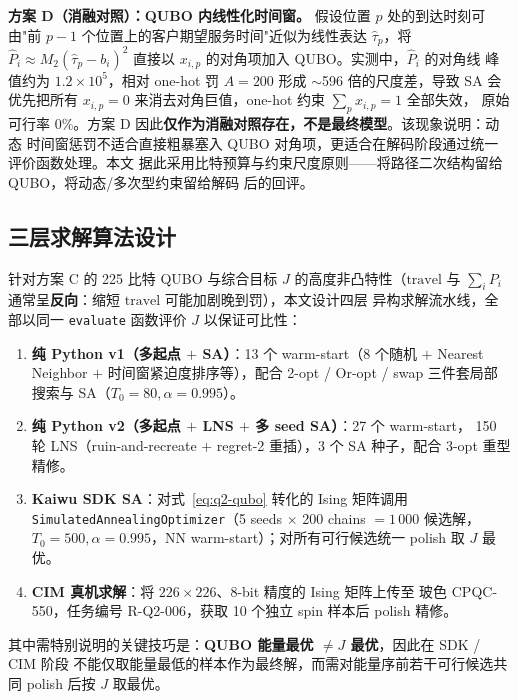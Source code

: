 \documentclass[UTF8,12pt,a4paper]{ctexart}
\begin{document}
\textbf{方案 D（消融对照）：QUBO 内线性化时间窗。} 假设位置 $p$ 处的到达时刻可由"前 $p-1$
个位置上的客户期望服务时间"近似为线性表达 $\hat\tau_p$，将 $\hat P_i\approx
M_2(\hat\tau_p-b_i)^{2}$ 直接以 $x_{i,p}$ 的对角项加入 QUBO。实测中，$\hat P_i$ 的对角线
峰值约为 $1.2\times 10^{5}$，相对 one-hot 罚 $A=200$ 形成 $\sim$596 倍的尺度差，导致 SA
会优先把所有 $x_{i,p}\!=\!0$ 来消去对角巨值，one-hot 约束 $\sum_p x_{i,p}=1$ 全部失效，
原始可行率 0\%。方案 D 因此\textbf{仅作为消融对照存在，不是最终模型}。该现象说明：动态
时间窗惩罚不适合直接粗暴塞入 QUBO 对角项，更适合在解码阶段通过统一评价函数处理。本文
据此采用比特预算与约束尺度原则——将路径二次结构留给 QUBO，将动态/多次型约束留给解码
后的回评。

\subsection{三层求解算法设计}
\label{subsec:q2-algo}

针对方案 C 的 225 比特 QUBO 与综合目标 $J$ 的高度非凸特性（$\mathrm{travel}$ 与
$\sum_i P_i$ 通常呈\textbf{反向}：缩短 $\mathrm{travel}$ 可能加剧晚到罚），本文设计四层
异构求解流水线，全部以同一 \texttt{evaluate} 函数评价 $J$ 以保证可比性：
\begin{enumerate}
  \item[(i)] \textbf{纯 Python v1（多起点 $+$ SA）}：13 个 warm-start（8 个随机 $+$
    Nearest Neighbor $+$ 时间窗紧迫度排序等），配合 2-opt / Or-opt / swap 三件套局部
    搜索与 SA（$T_0=80,\alpha=0.995$）。
  \item[(ii)] \textbf{纯 Python v2（多起点 $+$ LNS $+$ 多 seed SA）}：27 个 warm-start，
    150 轮 LNS（ruin-and-recreate $+$ regret-2 重插），3 个 SA 种子，配合 3-opt 重型精修。
  \item[(iii)] \textbf{Kaiwu SDK SA}：对式~\eqref{eq:q2-qubo} 转化的 Ising 矩阵调用
    \texttt{SimulatedAnnealingOptimizer}（5 seeds $\times$ 200 chains $=1\,000$ 候选解，
    $T_0=500,\alpha=0.995$，NN warm-start）；对所有可行候选统一 polish 取 $J$ 最优。
  \item[(iv)] \textbf{CIM 真机求解}：将 $226\times 226$、8-bit 精度的 Ising 矩阵上传至
    玻色 CPQC-550，任务编号 R-Q2-006，获取 10 个独立 spin 样本后 polish 精修。
\end{enumerate}
其中需特别说明的关键技巧是：\textbf{QUBO 能量最优 $\ne J$ 最优}，因此在 SDK / CIM 阶段
不能仅取能量最低的样本作为最终解，而需对能量序前若干可行候选共同 polish 后按 $J$ 取最优。
\end{document}
